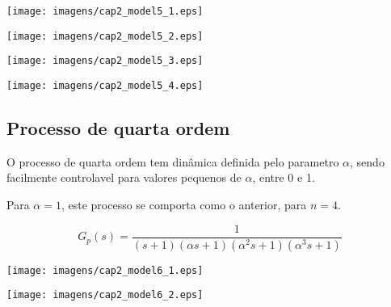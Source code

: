     \begin{center}
        \texttt{[image: imagens/cap2\_model5\_1.eps]}
    \end{center}
    
    \begin{center}
        \texttt{[image: imagens/cap2\_model5\_2.eps]}
    \end{center}
    
    \begin{center}
        \texttt{[image: imagens/cap2\_model5\_3.eps]}
    \end{center}
    
    \begin{center}
        \texttt{[image: imagens/cap2\_model5\_4.eps]}
    \end{center}

\subsection{Processo de quarta ordem}
    
    O processo de quarta ordem tem dinâmica definida pelo parametro $\alpha$,
    sendo facilmente controlavel para valores pequenos de $\alpha$, entre 0 e 1.
    
    Para $\alpha = 1$, este processo se comporta como o anterior, para $n = 4$.
    
    \begin{equation}
        G_p(s) = \frac{1}{(s+1)(\alpha s+1)(\alpha ^2 s+1)(\alpha ^3 s+1)}
    \end{equation}

    \begin{center}
        \texttt{[image: imagens/cap2\_model6\_1.eps]}
    \end{center}
    
    \begin{center}
        \texttt{[image: imagens/cap2\_model6\_2.eps]}
    \end{center}


